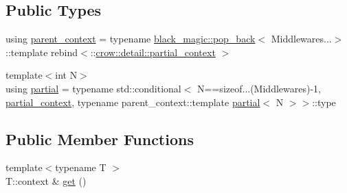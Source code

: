 \subsection*{Public Types}
\begin{DoxyCompactItemize}
\item 
using \hyperlink{structcrow_1_1detail_1_1partial__context_a96e8bff131568e0e6ecffd75b5b29e09}{parent\-\_\-context} = typename \hyperlink{structcrow_1_1black__magic_1_1pop__back}{black\-\_\-magic\-::pop\-\_\-back}$<$ Middlewares...$>$\-::template rebind$<$\-::\hyperlink{structcrow_1_1detail_1_1partial__context}{crow\-::detail\-::partial\-\_\-context} $>$
\item 
{\footnotesize template$<$int N$>$ }\\using \hyperlink{structcrow_1_1detail_1_1partial__context_ae7b6d83d169cdaa5d611da8796f9634c}{partial} = typename std\-::conditional$<$ N==sizeof...(Middlewares)-\/1, \hyperlink{structcrow_1_1detail_1_1partial__context}{partial\-\_\-context}, typename parent\-\_\-context\-::template \hyperlink{structcrow_1_1detail_1_1partial__context_ae7b6d83d169cdaa5d611da8796f9634c}{partial}$<$ N $>$$>$\-::type
\end{DoxyCompactItemize}
\subsection*{Public Member Functions}
\begin{DoxyCompactItemize}
\item 
{\footnotesize template$<$typename T $>$ }\\T\-::context \& \hyperlink{structcrow_1_1detail_1_1partial__context_ac787877fdf379960d15067f2bc526850}{get} ()
\end{DoxyCompactItemize}



